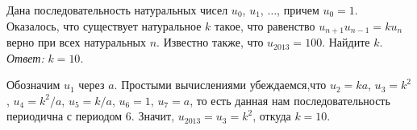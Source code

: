 \problem{}
Дана последовательность натуральных чисел $u_0$, $u_1$, $\ldots$, причем
$u_0 = 1$.
Оказалось, что существует натуральное $k$ такое, что равенство
$u_{n+1} u_{n-1} = k u_n$ верно при всех натуральных $n$.
Известно также, что $u_{2013} = 100$.
Найдите $k$.
\solution
\emph{Ответ:} $k = 10$.
\par
Обозначим $u_1$ через $a$.
Простыми вычислениями убеждаемся,что
$u_2 = k a$, $u_3 = k^2$, $u_4 = k^2 / a$, $u_5 = k / a$, $u_6 = 1$, $u_7 = a$,
то есть данная нам последовательность периодична с периодом 6.
Значит, $u_{2013} = u_3 = k^2$, откуда $k = 10$.
\endproblem
